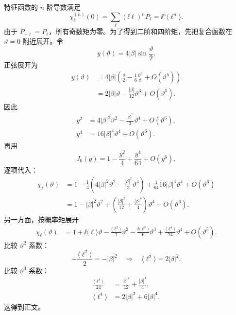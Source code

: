 \begin{derivation}
特征函数的 $n$ 阶导数满足
\begin{equation*}
 \chi_\ell^{(n)}(0)
 =\sum_\ell(\ii\ell)^nP_\ell
 =\ii^n\langle\ell^n\rangle.
\end{equation*}
由于 $P_{-\ell}=P_\ell$，所有奇数矩为零。为了得到二阶和四阶矩，先把复合函数在 $\vartheta=0$ 附近展开。令
\begin{equation*}
 y(\vartheta)
 =4|\beta|\sin\frac{\vartheta}{2}.
\end{equation*}
正弦展开为
\begin{align*}
 y(\vartheta)
 &=4|\beta|
 \left(\frac\vartheta2-\frac1{6}\frac{\vartheta^3}{8}
 +O(\vartheta^5)\right)\\
 &=2|\beta|\vartheta
 -\frac{|\beta|}{12}\vartheta^3
 +O(\vartheta^5).
\end{align*}
因此
\begin{align*}
 y^2
 &=4|\beta|^2\vartheta^2
 -\frac{|\beta|^2}{3}\vartheta^4
 +O(\vartheta^6),\\
 y^4
 &=16|\beta|^4\vartheta^4
 +O(\vartheta^6).
\end{align*}
再用
\begin{equation*}
 J_0(y)
 =1-\frac{y^2}{4}+\frac{y^4}{64}+O(y^6),
\end{equation*}
逐项代入：
\begin{align*}
 \chi_\ell(\vartheta)
 &=1-\frac14
 \left(4|\beta|^2\vartheta^2
 -\frac{|\beta|^2}{3}\vartheta^4\right)
 +\frac1{64}
 16|\beta|^4\vartheta^4
 +O(\vartheta^6)\\
 &=1-|\beta|^2\vartheta^2
 +\left(
 \frac{|\beta|^2}{12}
 +\frac{|\beta|^4}{4}
 \right)\vartheta^4
 +O(\vartheta^6).
\end{align*}
另一方面，按概率矩展开
\begin{align*}
 \chi_\ell(\vartheta)
 &=1
 +\ii\langle\ell\rangle\vartheta
 -\frac{\langle\ell^2\rangle}{2}\vartheta^2
 -\frac{\ii\langle\ell^3\rangle}{6}\vartheta^3
 +\frac{\langle\ell^4\rangle}{24}\vartheta^4
 +O(\vartheta^5).
\end{align*}
比较 $\vartheta^2$ 系数：
\begin{equation*}
 -\frac{\langle\ell^2\rangle}{2}=-|\beta|^2
 \quad\Rightarrow\quad
 \langle\ell^2\rangle=2|\beta|^2.
\end{equation*}
比较 $\vartheta^4$ 系数：
\begin{align*}
 \frac{\langle\ell^4\rangle}{24}
 &=\frac{|\beta|^2}{12}+\frac{|\beta|^4}{4},\\
 \langle\ell^4\rangle
 &=2|\beta|^2+6|\beta|^4.
\end{align*}
这得到正文。


\end{derivation}
